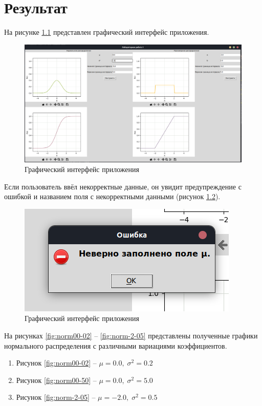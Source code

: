 \chapter{Результат}

На рисунке \ref{fig:gui} представлен графический интерфейс приложения.

\begin{figure}[H]
	\centering
	\includegraphics[width=\linewidth]{assets/gui.png}
	\caption{Графический интерфейс приложения}
	\label{fig:gui}
\end{figure}

Если пользователь ввёл некорректные данные, он увидит предупреждение с ошибкой и названием поля с некорректными данными (рисунок \ref{fig:msgbox}).

\begin{figure}[H]
	\centering
	\includegraphics[width=0.6\linewidth]{assets/msgbox.png}
	\caption{Графический интерфейс приложения}
	\label{fig:msgbox}
\end{figure}

На рисунках \ref{fig:norm00-02} -- \ref{fig:norm-2-05} представлены полученные графики нормального распределения с различными вариациями коэффициентов.
\begin{enumerate}
	\item Рисунок \ref{fig:norm00-02} -- $\mu = 0.0, \; \sigma^2 = 0.2$
	\item Рисунок \ref{fig:norm00-50} -- $\mu = 0.0, \; \sigma^2 = 5.0$
	\item Рисунок \ref{fig:norm-2-05} -- $\mu = -2.0, \; \sigma^2 = 0.5$
\end{enumerate}

